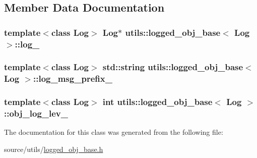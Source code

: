 \subsection{Member Data Documentation}
\hypertarget{classutils_1_1logged__obj__base_a8dedfdc5d7ab2e5aaed5e24797e51977}{
\subsubsection[{log\-\_\-}]{\setlength{\rightskip}{0pt plus 5cm}template$<$class Log$>$ Log$\ast$ {\bf utils\-::logged\-\_\-obj\-\_\-base}$<$ Log $>$\-::log\-\_\-\hspace{0.3cm}{\ttfamily [protected]}}}\label{classutils_1_1logged__obj__base_a8dedfdc5d7ab2e5aaed5e24797e51977}
\hypertarget{classutils_1_1logged__obj__base_a00f8823833fdda5f000de5178e642a95}{
\subsubsection[{log\-\_\-msg\-\_\-prefix\-\_\-}]{\setlength{\rightskip}{0pt plus 5cm}template$<$class Log$>$ std\-::string {\bf utils\-::logged\-\_\-obj\-\_\-base}$<$ Log $>$\-::log\-\_\-msg\-\_\-prefix\-\_\-\hspace{0.3cm}{\ttfamily [protected]}}}\label{classutils_1_1logged__obj__base_a00f8823833fdda5f000de5178e642a95}
\hypertarget{classutils_1_1logged__obj__base_a3723877fed12d62835b9d19c9eec49ec}{
\subsubsection[{obj\-\_\-log\-\_\-lev\-\_\-}]{\setlength{\rightskip}{0pt plus 5cm}template$<$class Log$>$ {\bf int} {\bf utils\-::logged\-\_\-obj\-\_\-base}$<$ Log $>$\-::obj\-\_\-log\-\_\-lev\-\_\-\hspace{0.3cm}{\ttfamily [protected]}}}\label{classutils_1_1logged__obj__base_a3723877fed12d62835b9d19c9eec49ec}


The documentation for this class was generated from the following file\-:\begin{DoxyCompactItemize}
\item 
source/utils/\hyperlink{logged__obj__base_8h}{logged\-\_\-obj\-\_\-base.\-h}\end{DoxyCompactItemize}
